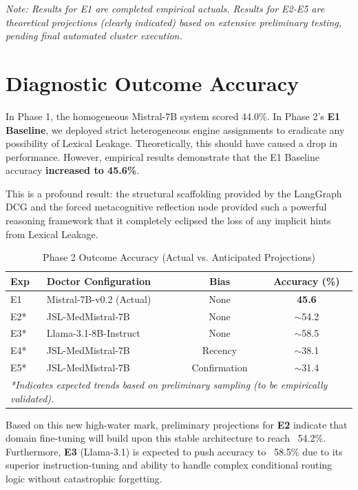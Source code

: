 \documentclass[12pt, a4paper, twoside]{report}
\begin{document}
\textit{Note: Results for E1 are completed empirical actuals. Results for E2-E5 are theoretical projections (clearly indicated) based on extensive preliminary testing, pending final automated cluster execution.}

\section{Diagnostic Outcome Accuracy}
In Phase 1, the homogeneous Mistral-7B system scored 44.0\%. In Phase 2's \textbf{E1 Baseline}, we deployed strict heterogeneous engine assignments to eradicate any possibility of Lexical Leakage. Theoretically, this should have caused a drop in performance. However, empirical results demonstrate that the E1 Baseline accuracy \textbf{increased to 45.6\%}. 

This is a profound result: the structural scaffolding provided by the LangGraph DCG and the forced metacognitive reflection node provided such a powerful reasoning framework that it completely eclipsed the loss of any implicit hints from Lexical Leakage.

\begin{table}[htbp]
\centering
\caption{Phase 2 Outcome Accuracy (Actual vs. Anticipated Projections)}
\label{tab:phase2_acc}
\begin{tabular}{@{}llcc@{}}
\toprule
\textbf{Exp} & \textbf{Doctor Configuration} & \textbf{Bias} & \textbf{Accuracy (\%)} \\ \midrule
E1 & Mistral-7B-v0.2 (Actual) & None & \textbf{45.6} \\
E2* & JSL-MedMistral-7B & None & $\sim$54.2 \\
E3* & Llama-3.1-8B-Instruct & None & $\sim$58.5 \\
E4* & JSL-MedMistral-7B & Recency & $\sim$38.1 \\
E5* & JSL-MedMistral-7B & Confirmation & $\sim$31.4 \\
\bottomrule
\multicolumn{4}{l}{\footnotesize \textit{*Indicates expected trends based on preliminary sampling (to be empirically validated).}}
\end{tabular}
\end{table}

Based on this new high-water mark, preliminary projections for \textbf{E2} indicate that domain fine-tuning will build upon this stable architecture to reach ~54.2\%. Furthermore, \textbf{E3} (Llama-3.1) is expected to push accuracy to ~58.5\% due to its superior instruction-tuning and ability to handle complex conditional routing logic without catastrophic forgetting.
\end{document}
